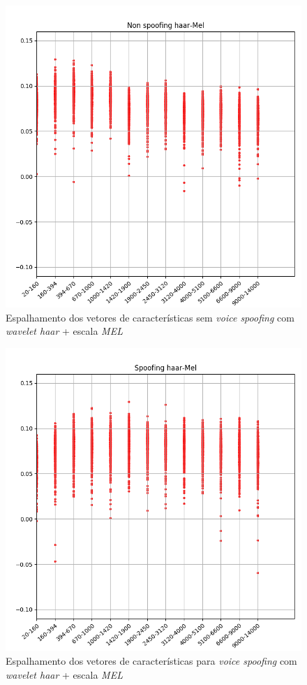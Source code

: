 		\begin{figure}[h]
			\centering
			\includegraphics[width=\linewidth]{images/results/barkVersusMel/liveHaarMel}
			\caption{Espalhamento dos vetores de características sem \textit{voice spoofing} com \textit{wavelet haar} + escala \textit{MEL} }
			\label{fig:livehaarmel}
		\end{figure}
		\begin{figure}[h]
			\centering
			\includegraphics[width=\linewidth]{images/results/barkVersusMel/spoofingHaarMel}
			\caption{Espalhamento dos vetores de características para \textit{voice spoofing} com \textit{wavelet haar} + escala \textit{MEL} }
			\label{fig:spoofinghaarmel}
		\end{figure}
